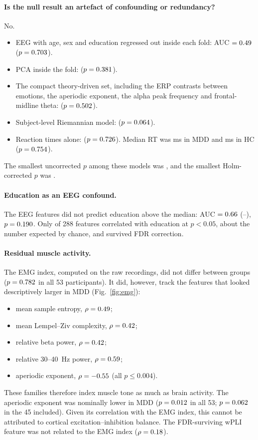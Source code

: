 \paragraph{Is the null result an artefact of confounding or redundancy?} No.
\begin{itemize}
  \item EEG with age, sex and education regressed out inside each fold: AUC $=0.49$
        ($p=0.703$).
  \item PCA inside the fold: \AudEEGAllPCALRAuc{} ($p=0.381$).
  \item The compact theory-driven set, including the ERP contrasts between emotions, the aperiodic exponent, the
        alpha peak frequency and frontal-midline theta: \AudCompactLRAuc{} ($p=0.502$).
  \item Subject-level Riemannian model: \AudSubjectRiemannTSLRAuc{} ($p=0.064$).
  \item Reaction times alone: \AudBehaviourRTLRAuc{} ($p=0.726$). Median RT was \AudRtMdd{} ms in MDD
        and \AudRtHc{} ms in HC ($p=0.754$).
\end{itemize}
The smallest uncorrected $p$ among these models was \AudMinP{}, and the smallest Holm-corrected $p$ was
\AudMinPholm.

\paragraph{Education as an EEG confound.} The EEG features did not predict education above the median: AUC
$=0.66$ (\AudEduLo--\AudEduHi), $p=0.190$. Only \AudEduNsig{} of 288 features correlated with education at
$p<0.05$, about the number expected by chance, and \AudEduNfdr{} survived FDR correction.

\paragraph{Residual muscle activity.} The EMG index, computed on the raw recordings, did not differ between groups
($p=0.782$ in all 53 participants). It did, however, track the features that looked descriptively larger in
MDD (Fig.~\ref{fig:emg}):
\begin{itemize}
  \item mean sample entropy, $\rho=0.49$;
  \item mean Lempel--Ziv complexity, $\rho=0.42$;
  \item relative beta power, $\rho=0.42$;
  \item relative 30--40~Hz power, $\rho=0.59$;
  \item aperiodic exponent, $\rho=-0.55$ (all $p\le0.004$).
\end{itemize}
These families therefore index muscle tone as much as brain activity. The aperiodic exponent was nominally lower in
MDD ($p=0.012$ in all 53; $p=0.062$ in the 45 included). Given its correlation with the EMG index,
this cannot be attributed to cortical excitation--inhibition balance. The FDR-surviving wPLI feature was not related
to the EMG index ($\rho=0.18$).

